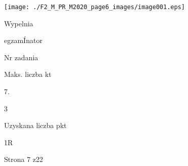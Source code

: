 \documentclass[a4paper,12pt]{article}
\begin{document}
\begin{center}
\texttt{[image: ./F2\_M\_PR\_M2020\_page6\_images/image001.eps]}
\end{center}
Wypelnia

egzamÍnator

Nr zadania

Maks. liczba kt

7.

3

Uzyskana liczba pkt

1R

Strona 7 z22
\end{document}
